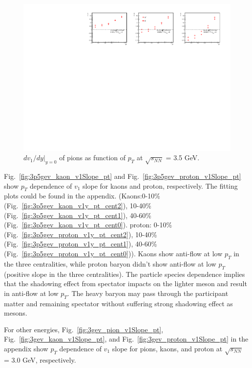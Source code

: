 \begin{figure}[hbt!]
\centering
\includegraphics[width=0.95\linewidth]{figures/chapter03/3p5gev_pionp_v1Slope_pT.pdf}
\caption{$dv_1/dy|_{y=0}$ of pions as function of $p_T$ at $\sqrt{s_{NN}}$ = 3.5 GeV.}
\label{fig:3p5gev_pion_v1Slope_pt}
\end{figure}

Fig.~\ref{fig:3p5gev_kaon_v1Slope_pt} and Fig.~\ref{fig:3p5gev_proton_v1Slope_pt} show $p_T$ dependence of $v_1$ slope for kaons and proton, respectively.
The fitting plots could be found in the appendix. (Kaons:0-10\% (Fig.~\ref{fig:3p5gev_kaon_v1y_pt_cent2}), 10-40\% (Fig.~\ref{fig:3p5gev_kaon_v1y_pt_cent1}), 40-60\% (Fig.~\ref{fig:3p5gev_kaon_v1y_pt_cent0}).
proton: 0-10\% (Fig.~\ref{fig:3p5gev_proton_v1y_pt_cent2}), 10-40\% (Fig.~\ref{fig:3p5gev_proton_v1y_pt_cent1}), 40-60\% (Fig.~\ref{fig:3p5gev_proton_v1y_pt_cent0})).
Kaons show anti-flow at low $p_T$ in the three centralities, 
while proton baryon didn't show anti-flow at low $p_T$ (positive slope in the three centralities).
The particle species dependence implies that the shadowing effect from spectator impacts on the lighter meson and result in anti-flow at low $p_T$. 
The heavy baryon may pass through the participant matter and remaining spectator without suffering strong shadowing effect as mesons.

For other energies, Fig.~\ref{fig:3gev_pion_v1Slope_pt}, Fig.~\ref{fig:3gev_kaon_v1Slope_pt}, and Fig.~\ref{fig:3gev_proton_v1Slope_pt} in the appendix show $p_T$ dependence of $v_1$ slope for pions, kaons, and proton at $\sqrt{s_{NN}}$ = 3.0 GeV, respectively.


